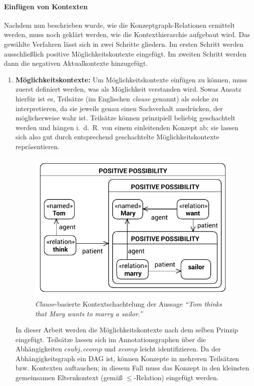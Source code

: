 \paragraph{Einfügen von Kontexten}
Nachdem nun beschrieben wurde, wie die Konzeptgraph-Relationen ermittelt werden, muss noch geklärt werden, wie die Kontexthierarchie aufgebaut wird.
Das gewählte Verfahren lässt sich in zwei Schritte gliedern.
Im ersten Schritt werden ausschließlich positive Möglichkeitskontexte eingefügt.
Im zweiten Schritt werden dann die negativen Aktualkontexte hinzugefügt.
\begin{enumerate}
	\item \textbf{Möglichkeitskontexte:}
		Um Möglichkeitskontexte einfügen zu können, muss zuerst definiert werden, was als Möglichkeit verstanden wird.
		Sowas Ansatz hierfür ist es, Teilsätze (im Englischen \textit{clause} genannt) als solche zu interpretieren, da sie jeweils genau einen Sachverhalt ausdrücken, der möglicherweise wahr ist.
		Teilsätze können prinzipiell beliebig geschachtelt werden und hängen i.~d.~R. von einem einleitenden Konzept ab;
		sie lassen sich also gut durch entsprechend geschachtelte Möglichkeitskontexte repräsentieren.
		\begin{figure}[t]
			\centering
			\includegraphics[scale=\cgScale]{gfx/text2kg/contextExtractionGraph1.pdf}
			\caption{\textit{Clause}-basierte Kontextschachtelung der Aussage \textit{``Tom thinks that Mary wants to marry a sailor.''}}\label{fig:text2kg:contextExtractionGraph1} %
		\end{figure}
		In dieser Arbeit werden die Möglichkeitskontexte nach dem selben Prinzip eingefügt.
		Teilsätze lassen sich im Annotationsgraphen über die Abhängigkeiten $csubj, ccomp$ und $xcomp$ leicht identifizieren.
		Da der Abhängigkeitsgraph ein DAG ist, können Konzepte in mehreren Teilsätzen bzw. Kontexten auftauchen;
		in diesem Fall muss das Konzept in den kleinsten gemeinsamen Elternkontext (gemäß $\leq$-Relation) eingefügt werden.


\end{enumerate}
